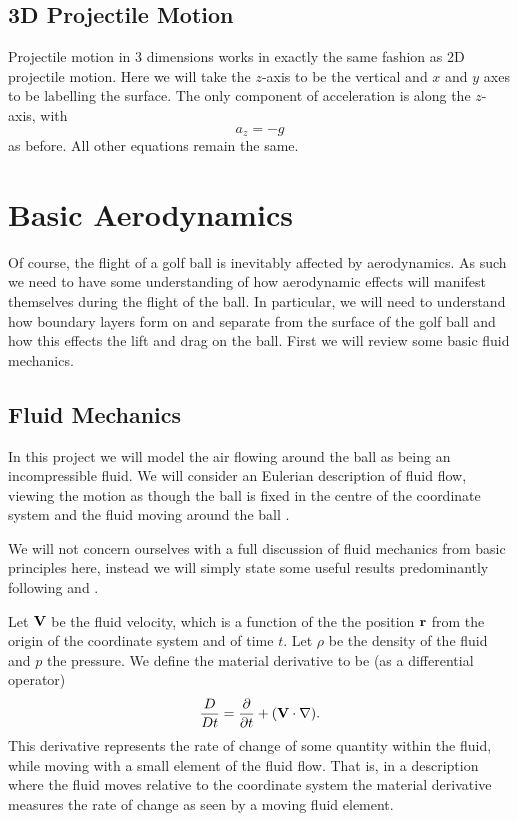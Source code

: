 \subsection{3D Projectile Motion}

Projectile motion in 3 dimensions works in exactly the same fashion as 2D projectile motion. Here we
will take the $z$-axis to be the vertical and $x$ and $y$ axes to be labelling the surface. The only
component of acceleration is along the $z$-axis, with
\[
a_z = -g
\]
as before. All other equations remain the same.

\section{Basic Aerodynamics}

Of course, the flight of a golf ball is inevitably affected by aerodynamics. As such we need to have
some understanding of how aerodynamic effects will manifest themselves during the flight of the ball. 
In particular, we will need to understand how boundary layers
form on and separate from the surface of the golf ball and how this effects the lift and drag on the ball.
First we will review some basic fluid mechanics.

\subsection{Fluid Mechanics}

In this project we will model the air flowing around the ball as being an incompressible fluid. We will
consider an Eulerian description of fluid flow, viewing the motion as though the ball is fixed in the centre
of the coordinate system and the fluid moving around the ball \citet{Ruban2014}.

We will not concern ourselves with a full discussion of fluid mechanics from basic principles here, 
instead we will simply state some useful results predominantly following \citet{Ruban2014} and 
\citet{sears}.

Let $\mathbf{V}$ be the fluid velocity, which is a function of the the position $\mathbf{r}$ from the origin of the
coordinate system and of time $t$. Let $\rho$ be the density of the fluid and $p$ the pressure. 
We define the material derivative to be (as a differential operator)
\begin{equation} \nonumber
\frac{D}{Dt} = \frac{\partial}{\partial t} + (\mathbf{V} \cdot \nabla) .
\end{equation}
This derivative represents the rate of change of some quantity within the fluid, while moving with a small element
of the fluid flow. That is, in a description where the fluid moves relative to the coordinate system
the material derivative measures the rate of change as seen by a moving fluid element.

